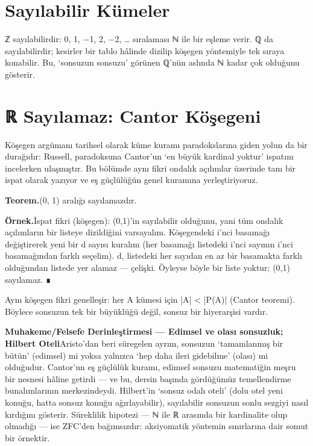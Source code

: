 \section{Sayılabilir Kümeler}

ℤ sayılabilirdir: 0, 1, −1, 2, −2, … sıralaması ℕ ile bir eşleme verir. ℚ da sayılabilirdir; kesirler bir tablo hâlinde dizilip köşegen yöntemiyle tek sıraya konabilir. Bu, ‘sonsuzun sonsuzu’ görünen ℚ’nün aslında ℕ kadar çok olduğunu gösterir.

\section{ℝ Sayılamaz: Cantor Köşegeni}

Köşegen argümanı tarihsel olarak küme kuramı paradokslarına giden yolun da bir durağıdır: Russell, paradoksuna Cantor’un ‘en büyük kardinal yoktur’ ispatını incelerken ulaşmıştır. Bu bölümde aynı fikri ondalık açılımlar üzerinde tam bir ispat olarak yazıyor ve eş güçlülüğün genel kuramına yerleştiriyoruz.

\begin{tcolorbox}[bookbox,colback=cDef]\textbf{\textsf{\textcolor{cAcc}{Teorem.}}}\quad (0, 1) aralığı sayılamazdır.\end{tcolorbox}

\begin{tcolorbox}[bookbox,colback=cEx]\textbf{\textsf{\textcolor{cAcc}{Örnek.}}}\quad İspat fikri (köşegen): (0,1)’in sayılabilir olduğunu, yani tüm ondalık açılımların bir listeye dizildiğini varsayalım. Köşegendeki i’nci basamağı değiştirerek yeni bir d sayısı kuralım (her basamağı listedeki i’nci sayının i’nci basamağından farklı seçelim). d, listedeki her sayıdan en az bir basamakta farklı olduğundan listede yer alamaz — çelişki. Öyleyse böyle bir liste yoktur; (0,1) sayılamaz. ∎\end{tcolorbox}

Aynı köşegen fikri genelleşir: her A kümesi için |A| < |P(A)| (Cantor teoremi). Böylece sonsuzun tek bir büyüklüğü değil, sonsuz bir hiyerarşisi vardır.

\begin{tcolorbox}[bookbox,colback=cDep]\textbf{\textsf{\textcolor{cAcc}{Muhakeme/Felsefe Derinleştirmesi — Edimsel ve olası sonsuzluk; Hilbert Oteli}}}\quad Aristo’dan beri süregelen ayrım, sonsuzun ‘tamamlanmış bir bütün’ (edimsel) mi yoksa yalnızca ‘hep daha ileri gidebilme’ (olası) mi olduğudur. Cantor’un eş güçlülük kuramı, edimsel sonsuzu matematiğin meşru bir nesnesi hâline getirdi — ve bu, dersin başında gördüğümüz temellendirme bunalımlarının merkezindeydi. Hilbert’in ‘sonsuz odalı oteli’ (dolu otel yeni konuğu, hatta sonsuz konuğu ağırlayabilir), sayılabilir sonsuzun sonlu sezgiyi nasıl kırdığını gösterir. Süreklilik hipotezi — ℕ ile ℝ arasında bir kardinalite olup olmadığı — ise ZFC’den bağımsızdır: aksiyomatik yöntemin sınırlarına dair somut bir örnektir.\end{tcolorbox}

